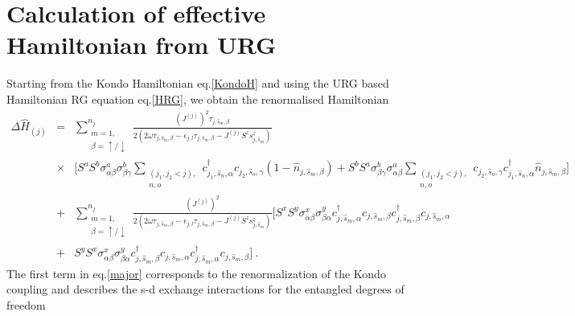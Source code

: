 \documentclass[aps,prb,preprint,groupedaddress]{revtex4-2}
\begin{document}
\section*{Calculation of effective Hamiltonian from URG}\label{Appendix-A}
\par\noindent
Starting from the Kondo Hamiltonian eq.\eqref{KondoH} and using the URG based Hamiltonian RG equation eq.\eqref{HRG}, we obtain the renormalised Hamiltonian 
\begin{eqnarray}
\Delta\hat{H}_{(j)} &=& \sum_{\substack{m=1,\\ \beta=\uparrow/\downarrow}}^{n_{j}}\frac{(J^{(j)})^{2}\tau_{j,\hat{s}_{m},\beta}}{2(2\omega\tau_{j,\hat{s}_{m},\beta} - \epsilon_{j,l}\tau_{j,\hat{s}_{m},\beta}-J^{(j)}S^{z}s^{z}_{j,\hat{s}_{m}})}\nonumber\\
&\times & \bigg[S^{a}S^{b}\sigma^{a}_{\alpha\beta}\sigma^{b}_{\beta\gamma} \sum_{\substack{(j_{1},j_{2}< j),\\ n,o}}c^{\dagger}_{j_{1},\hat{s}_{n},\alpha}c_{j_{2},\hat{s}_{o},\gamma}(1-\hat{n}_{j,\hat{s}_{m},\beta})+S^{b}S^{a}\sigma^{b}_{\beta\gamma}\sigma^{a}_{\alpha\beta} \sum_{\substack{(j_{1},j_{2}<j),\\ n,o}}c_{j_{2},\hat{s}_{o},\gamma}c^{\dagger}_{j_{1},\hat{s}_{n},\alpha}\hat{n}_{j,\hat{s}_{m},\beta}\bigg]\nonumber\\
&+&\sum_{\substack{m=1,\\ \beta=\uparrow/\downarrow}}^{n_{j}}\frac{(J^{(j)})^{2}}{2(2\omega\tau_{j,\hat{s}_{m},\beta} - \epsilon_{j,l}\tau_{j,\hat{s}_{m},\beta}-J^{(j)}S^{z}s^{z}_{j,\hat{s}_{m}})}\bigg[S^{x}S^{y}\sigma^{x}_{\alpha\beta}\sigma^{y}_{\beta\alpha}c^{\dagger}_{j,\hat{s}_{m},\alpha}c_{j,\hat{s}_{m},\beta}c^{\dagger}_{j,\hat{s}_{m},\beta}c_{j,\hat{s}_{m},\alpha}\nonumber\\
&+&S^{y}S^{x}\sigma^{x}_{\alpha\beta}\sigma^{y}_{\beta\alpha}c^{\dagger}_{j,\hat{s}_{m},\beta}c_{j,\hat{s}_{m},\alpha}c^{\dagger}_{j,\hat{s}_{m},\alpha}c_{j,\hat{s}_{m},\beta}\bigg]~.
\label{major}
\end{eqnarray}
The first term in eq.\eqref{major} corresponds to the renormalization of the Kondo coupling and describes the s-d exchange interactions for the entangled degrees of freedom
\end{document}
